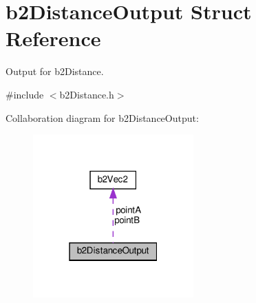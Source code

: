 \hypertarget{structb2DistanceOutput}{}\section{b2\+Distance\+Output Struct Reference}
\label{structb2DistanceOutput}


Output for b2\+Distance.  




{\ttfamily \#include $<$b2\+Distance.\+h$>$}



Collaboration diagram for b2\+Distance\+Output\+:
\nopagebreak
\begin{figure}[H]
\begin{center}
\leavevmode
\includegraphics[width=175pt]{structb2DistanceOutput__coll__graph}
\end{center}
\end{figure}
